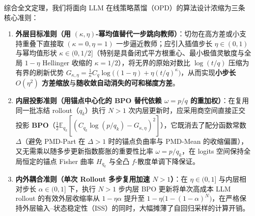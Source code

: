 \documentclass[lang=cn,scheme=chinese,openany]{../book/elegantbook}
\newcommand{\E}{\mathbb E}
\begin{document}
综合全文定理，我们将面向 LLM 在线策略蒸馏（OPD）的算法设计浓缩为三条核心准则：
\begin{enumerate}
 \item \textbf{外层目标准则（用 $(\kappa,\eta)$-幂均值替代一步跳向教师）}：切勿在高方差或小支持重叠下直接取 $(\kappa=0,\eta=1)$ 一步逼近教师；应引入插值步长 $\eta\in(0,1)$ 与幂均值形状 $\kappa\in(0,1/2]$（特别是具备闭式平方根重心、最小极值灵敏度与全局 $1-\eta$ Hellinger 收缩的 \textbf{$\kappa=1/2$}），将无界的原始对数比 $\log(t/q)$ 压缩为有界的刷新优势 $G_{\kappa,\eta}=\frac{1}{\kappa}C_q\log\bigl((1-\eta)+\eta(t/q)^\kappa\bigr)$，从而实现\textbf{小步长 $O(\eta^2)$ 方差缩放}与\textbf{随收敛自动消失的可和梯度方差}。
 \item \textbf{内层投影准则（用锚点中心化的 BPO 替代依赖 $\omega=p/q$ 的重加权）}：在复用同一批冻结 rollout（$q_k$）执行 $N>1$ 次内层更新时，应采用商空间直接正交投影 \textbf{BPO}（$\frac12\E_{q_k}[(C_{q_k}\log(p/q_k)-G_{\kappa,\eta})^2]$），它既消去了配分函数常数 $\Delta$（避免 PMD-Part 在 $\Delta>1$ 时的锚点负曲率与 PMD-Mean 的收缩偏置），又无需乘以随多步更新指数膨胀的重要性比率 $\omega=p/q_k$，在 logits 空间保持全局恒定的锚点 Fisher 曲率 $H_{q_k}$ 与全凸 $f$-散度单调下降保证。
 \item \textbf{内外耦合准则（单次 Rollout 多步复用加速 $N>1$）}：在 $\eta\in(0,1]$ 与内层相对步长 $\alpha\in(0,1]$ 下，执行 $N>1$ 步内层 BPO 更新将单次高成本 LLM rollout 的有效外层收缩率从 $1-\eta\alpha$ 提升至 $1-\eta\bigl(1-(1-\alpha)^N\bigr)$，在严格保持外层输入--状态稳定性（ISS）的同时，大幅摊薄了自回归采样的计算开销。
\end{enumerate}
\end{document}
